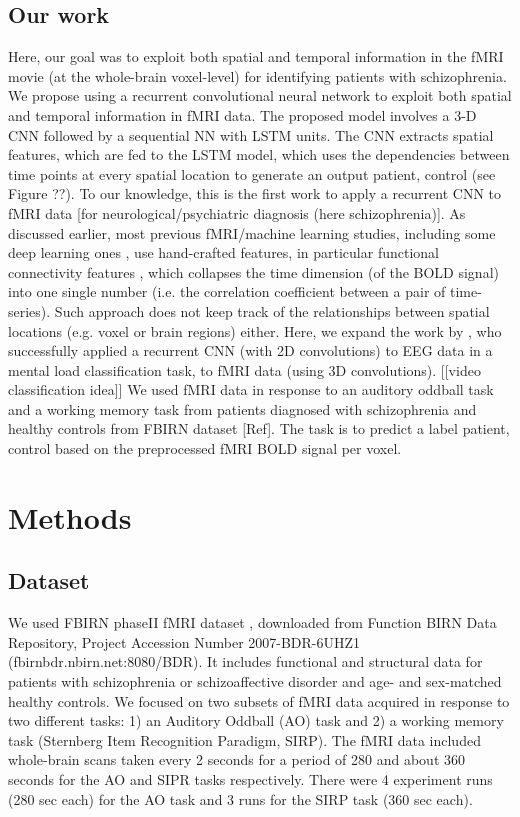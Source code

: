 \documentclass{article}
\begin{document}
\subsection{Our work}

Here, our goal was to exploit both spatial and temporal information in the fMRI movie (at the whole-brain voxel-level) for identifying patients with schizophrenia. We propose using a recurrent convolutional neural network to exploit both spatial and temporal information in fMRI data. The proposed model involves a 3-D CNN followed by a sequential NN with LSTM units. The CNN extracts spatial features, which are fed to the LSTM model, which uses the dependencies between time points at every spatial location to generate an output {patient, control} (see Figure ??). To our knowledge, this is the first work to apply a recurrent CNN to fMRI data [for neurological/psychiatric diagnosis (here schizophrenia)]. As discussed earlier, most previous fMRI/machine learning studies, including some deep learning ones \citep{Kim2016}, use hand-crafted features, in particular functional connectivity features \citep{Gheiratmand2017}, which collapses the time dimension (of the BOLD signal) into one single number (i.e. the correlation coefficient between a pair of time-series). Such approach does not keep track of the relationships between spatial locations (e.g. voxel or brain regions) either. Here, we expand the work by \citet{Bashivan2016}, who successfully applied a recurrent CNN (with 2D convolutions) to EEG data in a mental load classification task, to fMRI data (using 3D convolutions). [[video classification idea]] We used fMRI data in response to an auditory oddball task and a working memory task from patients diagnosed with schizophrenia and healthy controls from FBIRN dataset [Ref]. The task is to predict a label {patient, control} based on the preprocessed fMRI BOLD signal per voxel.

\section{Methods}

\subsection{Dataset}

We used FBIRN phaseII fMRI dataset \citep{Keator2016}, downloaded from Function BIRN Data Repository, Project Accession Number 2007-BDR-6UHZ1 (fbirnbdr.nbirn.net:8080/BDR). It includes functional and structural data for patients with schizophrenia or schizoaffective disorder and age- and sex-matched healthy controls. We focused on two subsets of fMRI data acquired in response to two different tasks: 1) an Auditory Oddball (AO) task and 2) a working memory task (Sternberg Item Recognition Paradigm, SIRP). The fMRI data included whole-brain scans taken every 2 seconds for a period of 280 and about 360 seconds for the AO and SIPR tasks respectively. There were 4 experiment runs (280 sec each) for the AO task and 3 runs for the SIRP task (360 sec each).
\end{document}
